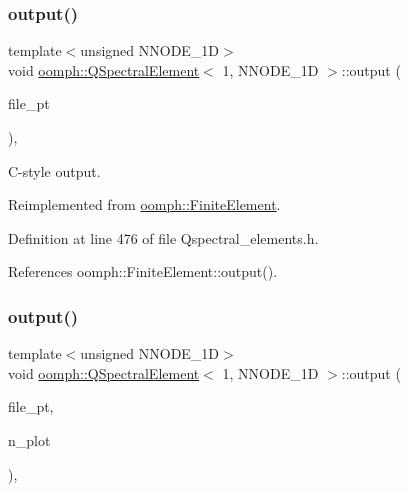 \subsubsection{\texorpdfstring{output()}{output()}\hspace{0.1cm}{\footnotesize\ttfamily [1/4]}}
{\footnotesize\ttfamily template$<$unsigned N\+N\+O\+D\+E\+\_\+1D$>$ \\
void \hyperlink{classoomph_1_1QSpectralElement}{oomph\+::\+Q\+Spectral\+Element}$<$ 1, N\+N\+O\+D\+E\+\_\+1D $>$\+::output (\begin{DoxyParamCaption}\item[{F\+I\+LE $\ast$}]{file\+\_\+pt }\end{DoxyParamCaption})\hspace{0.3cm}{\ttfamily [inline]}, {\ttfamily [virtual]}}



C-\/style output. 



Reimplemented from \hyperlink{classoomph_1_1FiniteElement_a72cddd09f8ddbee1a20a1ff404c6943e}{oomph\+::\+Finite\+Element}.



Definition at line 476 of file Qspectral\+\_\+elements.\+h.



References oomph\+::\+Finite\+Element\+::output().

\mbox{\label{classoomph_1_1QSpectralElement_3_011_00_01NNODE__1D_01_4_ae4debc9ccd8ac671dabca7bafc657683}} 
\subsubsection{\texorpdfstring{output()}{output()}\hspace{0.1cm}{\footnotesize\ttfamily [2/4]}}
{\footnotesize\ttfamily template$<$unsigned N\+N\+O\+D\+E\+\_\+1D$>$ \\
void \hyperlink{classoomph_1_1QSpectralElement}{oomph\+::\+Q\+Spectral\+Element}$<$ 1, N\+N\+O\+D\+E\+\_\+1D $>$\+::output (\begin{DoxyParamCaption}\item[{F\+I\+LE $\ast$}]{file\+\_\+pt,  }\item[{const unsigned \&}]{n\+\_\+plot }\end{DoxyParamCaption})\hspace{0.3cm}{\ttfamily [inline]}, {\ttfamily [virtual]}}



